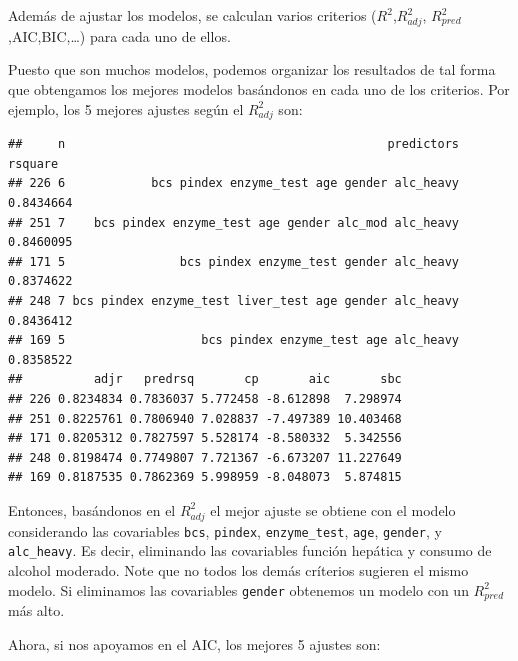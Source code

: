 \documentclass[
]{article}
\newenvironment{Shaded}{\begin{snugshade}}{\end{snugshade}}
\newcommand{\AttributeTok}[1]{\textcolor[rgb]{0.77,0.63,0.00}{#1}}
\newcommand{\DecValTok}[1]{\textcolor[rgb]{0.00,0.00,0.81}{#1}}
\newcommand{\FunctionTok}[1]{\textcolor[rgb]{0.00,0.00,0.00}{#1}}
\newcommand{\NormalTok}[1]{#1}
\newcommand{\OtherTok}[1]{\textcolor[rgb]{0.56,0.35,0.01}{#1}}
\newcommand{\SpecialCharTok}[1]{\textcolor[rgb]{0.00,0.00,0.00}{#1}}
\begin{document}
Además de ajustar los modelos, se calculan varios criterios (\(R^{2}\),\(R^{2}_{adj}\), \(R^{2}_{pred}\),AIC,BIC,\ldots) para cada uno de ellos.

Puesto que son muchos modelos, podemos organizar los resultados de tal forma que obtengamos los mejores modelos basándonos en cada uno de los criterios. Por ejemplo, los 5 mejores ajustes según el \(R^{2}_{adj}\) son:

\begin{Shaded}
\end{Shaded}

\begin{verbatim}
##     n                                             predictors   rsquare
## 226 6            bcs pindex enzyme_test age gender alc_heavy 0.8434664
## 251 7    bcs pindex enzyme_test age gender alc_mod alc_heavy 0.8460095
## 171 5                bcs pindex enzyme_test gender alc_heavy 0.8374622
## 248 7 bcs pindex enzyme_test liver_test age gender alc_heavy 0.8436412
## 169 5                   bcs pindex enzyme_test age alc_heavy 0.8358522
##          adjr   predrsq       cp       aic       sbc
## 226 0.8234834 0.7836037 5.772458 -8.612898  7.298974
## 251 0.8225761 0.7806940 7.028837 -7.497389 10.403468
## 171 0.8205312 0.7827597 5.528174 -8.580332  5.342556
## 248 0.8198474 0.7749807 7.721367 -6.673207 11.227649
## 169 0.8187535 0.7862369 5.998959 -8.048073  5.874815
\end{verbatim}

Entonces, basándonos en el \(R^{2}_{adj}\) el mejor ajuste se obtiene con el modelo considerando las covariables \texttt{bcs}, \texttt{pindex}, \texttt{enzyme\_test}, \texttt{age}, \texttt{gender}, y \texttt{alc\_heavy}. Es decir, eliminando las covariables función hepática y consumo de alcohol moderado. Note que no todos los demás críterios sugieren el mismo modelo. Si eliminamos las covariables \texttt{gender} obtenemos un modelo con un \(R^{2}_{pred}\) más alto.

Ahora, si nos apoyamos en el AIC, los mejores 5 ajustes son:
\end{document}
